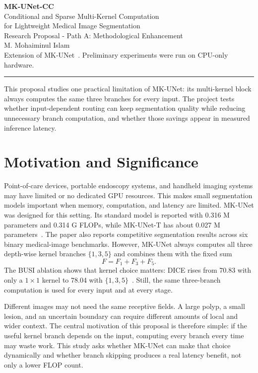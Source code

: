 \documentclass[10pt,a4paper]{article}
\begin{document}
\begin{center}
{\LARGE\bfseries MK-UNet-CC}\\[3pt]
{\large Conditional and Sparse Multi-Kernel Computation}\\
{\normalsize for Lightweight Medical Image Segmentation}\\[6pt]
{\small Research Proposal - Path A: Methodological Enhancement}\\[3pt]
{\normalsize M. Mohaiminul Islam}\\[4pt]
{\footnotesize Extension of MK-UNet~\cite{rahman2025mkunet}. Preliminary experiments were run on CPU-only hardware.}
\end{center}
\vspace{0.25em}
\noindent\rule{\linewidth}{0.45pt}
\vspace{0.3em}

\noindent
This proposal studies one practical limitation of MK-UNet: its multi-kernel block always computes the same three branches for every input. The project tests whether input-dependent routing can keep segmentation quality while reducing unnecessary branch computation, and whether those savings appear in measured inference latency.


\section{Motivation and Significance}

Point-of-care devices, portable endoscopy systems, and handheld imaging systems may have limited or no dedicated GPU resources. This makes small segmentation models important when memory, computation, and latency are limited. MK-UNet was designed for this setting. Its standard model is reported with 0.316 M parameters and 0.314 G FLOPs, while MK-UNet-T has about 0.027 M parameters~\cite{rahman2025mkunet}. The paper also reports competitive segmentation results across six binary medical-image benchmarks. However, MK-UNet always computes all three depth-wise kernel branches $\{1,3,5\}$ and combines them with the fixed sum
\[
F=F_1+F_3+F_5.
\]
The BUSI ablation shows that kernel choice matters: DICE rises from 70.83 with only a $1\times1$ kernel to 78.04 with $\{1,3,5\}$~\cite{rahman2025mkunet}. Still, the same three-branch computation is used for every input and at every stage.

Different images may not need the same receptive fields. A large polyp, a small lesion, and an uncertain boundary can require different amounts of local and wider context. The central motivation of this proposal is therefore simple: if the useful kernel branch depends on the input, computing every branch every time may waste work. This study asks whether MK-UNet can make that choice dynamically and whether branch skipping produces a real latency benefit, not only a lower FLOP count.
\end{document}
